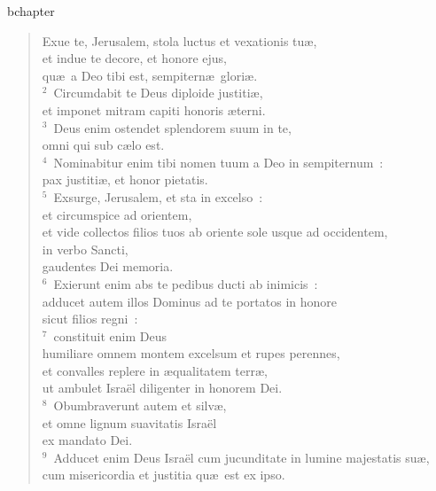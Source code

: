 bchapter\begin{verse}\vspace{-19pt}Exue te, Jerusalem, stola luctus et vexationis tu\ae ,\\ et indue te decore, et honore ejus,\\ qu\ae\ a Deo tibi est, sempitern\ae\ glori\ae .\\
${}^{2}$~Circumdabit te Deus diploide justiti\ae ,\\ et imponet mitram capiti honoris \ae terni.\\
${}^{3}$~Deus enim ostendet splendorem suum in te,\\ omni qui sub c\ae lo est.\\
${}^{4}$~Nominabitur enim tibi nomen tuum a Deo in sempiternum~:\\ pax justiti\ae , et honor pietatis.\\
${}^{5}$~Exsurge, Jerusalem, et sta in excelso~:\\ et circumspice ad orientem,\\ et vide collectos filios tuos ab oriente sole usque ad occidentem,\\ in verbo Sancti,\\ gaudentes Dei memoria.\\
${}^{6}$~Exierunt enim abs te pedibus ducti ab inimicis~:\\ adducet autem illos Dominus ad te portatos in honore\\ sicut filios regni~:\\
${}^{7}$~constituit enim Deus\\ humiliare omnem montem excelsum et rupes perennes,\\ et convalles replere in \ae qualitatem terr\ae ,\\ ut ambulet Isra\"el diligenter in honorem Dei.\\
${}^{8}$~Obumbraverunt autem et silv\ae ,\\ et omne lignum suavitatis Isra\"el\\ ex mandato Dei.\\
${}^{9}$~Adducet enim Deus Isra\"el cum jucunditate in lumine majestatis su\ae ,\\ cum misericordia et justitia qu\ae\ est ex ipso.\end{verse}



